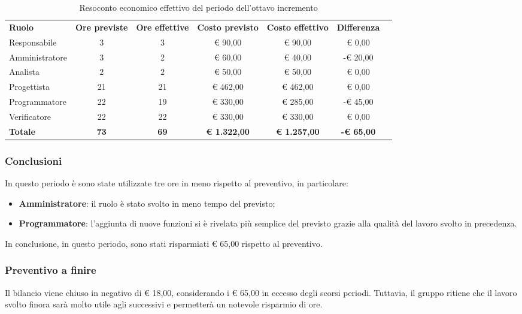 \documentclass[../piano-di-progetto.tex]{subfiles}
\begin{document}
  \begin{table}[H]
    \centering
    \begin{tabular}{lcccccc}
      \rowcolor{lightgray}
      \textbf{Ruolo}  & \textbf{Ore previste} & \textbf{Ore effettive} & \textbf{Costo previsto} & \textbf{Costo effettivo} & \textbf{Differenza} \\
Responsabile    & 3           & 3           & € 90,00             & € 90,00             & € 0,00            \\
Amministratore  & 3           & 2           & € 60,00             & € 40,00             & -€ 20,00          \\
Analista        & 2           & 2           & € 50,00             & € 50,00             & € 0,00            \\
Progettista     & 21          & 21          & € 462,00            & € 462,00            & € 0,00            \\
Programmatore   & 22          & 19          & € 330,00            & € 285,00            & -€ 45,00          \\
Verificatore    & 22          & 22          & € 330,00            & € 330,00            & € 0,00            \\
\textbf{Totale} & \textbf{73} & \textbf{69} & \textbf{€ 1.322,00} & \textbf{€ 1.257,00} & \textbf{-€ 65,00}

    \end{tabular}
    \caption{Resoconto economico effettivo del periodo dell'ottavo incremento}
  \end{table}
\subsubsection{Conclusioni}
In questo periodo è sono state utilizzate tre ore in meno rispetto al preventivo, in particolare:


\begin{itemize}
    \item \textbf{Amministratore}: il ruolo è stato svolto in meno tempo del previsto;
    \item \textbf{Programmatore}: l'aggiunta di nuove funzioni si è rivelata più semplice del previsto grazie alla qualità del lavoro svolto in precedenza.
\end{itemize}
In conclusione, in questo periodo, sono stati risparmiati € 65,00 rispetto al preventivo.

\subsubsection{Preventivo a finire}
Il bilancio viene chiuso in negativo di € 18,00, considerando i € 65,00 in eccesso degli scorsi periodi. Tuttavia, il gruppo ritiene che il lavoro svolto finora sarà molto utile agli successivi e permetterà un notevole risparmio di ore.
\end{document}
